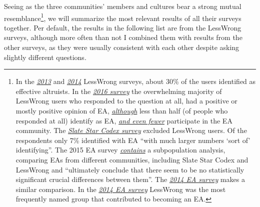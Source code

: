 Seeing as the three communities' members and cultures bear a strong
mutual resemblance\footnote{In the
  \href{http://lesswrong.com/lw/jj0/2013_survey_results/}{\emph{2013}}
  and
  \href{http://lesswrong.com/lw/lhg/2014_survey_results/}{\emph{2014}}
  LessWrong surveys, about 30\% of the users identified as effective
  altruists. In the
  \href{https://web.archive.org/web/20161019073217/http://jdpressman.com/public/lwsurvey2016/Survey_554193_LessWrong_Diaspora_2016_Survey\%282\%29.pdf\#page=158}{\emph{2016
  survey}} the overwhelming majority of LessWrong users who responded to
  the question at all, had a positive or mostly positive opinion of EA,
  \href{https://web.archive.org/web/20161019073217/http://jdpressman.com/public/lwsurvey2016/Survey_554193_LessWrong_Diaspora_2016_Survey\%282\%29.pdf\#page=154}{\emph{although}}
  less than half (of people who responded at all) identify as EA,
  \href{https://web.archive.org/web/20161019073217/http://jdpressman.com/public/lwsurvey2016/Survey_554193_LessWrong_Diaspora_2016_Survey\%282\%29.pdf\#page=155}{\emph{and
  even fewer}} participate in the EA community. The
  \href{http://slatestarcodex.com/2015/11/04/2014-ssc-survey-results/}{\emph{Slate
  Star Codex survey}} excluded LessWrong users. Of the respondents only
  7\% identified with EA ``with much larger numbers `sort of'
  identifying''. The 2015 EA survey
  \href{https://eahub.org/sites/eahub.org/files/SurveyReport2015.pdf\#page=27}{\emph{contains}}
  a subpopulation analysis, comparing EAs from different communities,
  including Slate Star Codex and LessWrong and ``ultimately conclude
  that there seem to be no statistically significant crucial differences
  between them''. The
  \href{https://webcache.googleusercontent.com/search?q=cache:nmlsoMrw1JMJ:https://eahub.org/sites/effectivealtruismhub.com/files/survey/2014/results-and-analysis.pdf+\&cd=1\&hl=en\&ct=clnk\&gl=de}{\emph{2014
  EA survey}} makes a similar comparison. In the
  \href{https://webcache.googleusercontent.com/search?q=cache:nmlsoMrw1JMJ:https://eahub.org/sites/effectivealtruismhub.com/files/survey/2014/results-and-analysis.pdf+\&cd=1\&hl=en\&ct=clnk\&gl=de}{\emph{2014
  EA survey}} LessWrong was the most frequently named group that
  contributed to becoming an EA.}, we will summarize the most relevant
results of all their surveys together. Per default, the results in the
following list are from the LessWrong surveys, although more often than
not I combined them with results from the other surveys, as they were
usually consistent with each other despite asking slightly different
questions.

